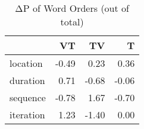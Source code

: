 \begin{table}[htbp!]
\centering
\caption{ΔP of Word Orders (out of total)}
\label{table:order_fs}
\begin{tabular}{lrrr}
\toprule
{} &    VT &    TV &     T \\
\midrule
location  & -0.49 &  0.23 &  0.36 \\
duration  &  0.71 & -0.68 & -0.06 \\
sequence  & -0.78 &  1.67 & -0.70 \\
iteration &  1.23 & -1.40 &  0.00 \\
\bottomrule
\end{tabular}
\end{table}
